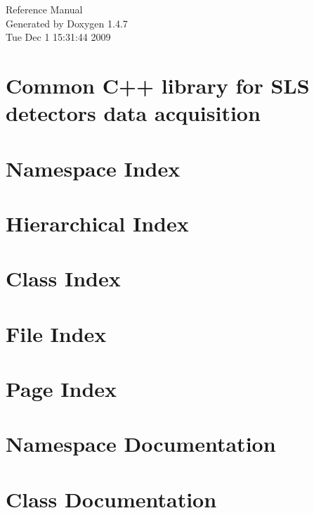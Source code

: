 \documentclass[a4paper]{book}
\begin{document}
\begin{titlepage}
\vspace*{7cm}
\begin{center}
{\Large Reference Manual}\\
\vspace*{1cm}
{\large Generated by Doxygen 1.4.7}\\
\vspace*{0.5cm}
{\small Tue Dec 1 15:31:44 2009}\\
\end{center}
\end{titlepage}
\clearemptydoublepage
{}
\tableofcontents
\clearemptydoublepage
{}
\chapter{Common C++ library for SLS detectors data acquisition }
\label{index}
\chapter{Namespace Index}

\chapter{Hierarchical Index}

\chapter{Class Index}

\chapter{File Index}

\chapter{Page Index}

\chapter{Namespace Documentation}

\chapter{Class Documentation}












\end{document}
